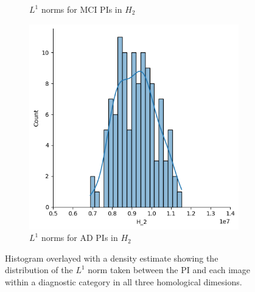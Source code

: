 \documentclass{article}
\begin{document}
\begin{figure}[htb]
\begin{subfigure}{0.32\textwidth}
    \caption{$L^1$ norms for MCI PIs in $H_2$}
  \end{subfigure}
  \begin{subfigure}{0.32\textwidth}
    \includegraphics[width=\textwidth]{figures/median_pis/median_pi_AD_H_2_displot.png}
    \caption{$L^1$ norms for AD PIs in $H_2$}
  \end{subfigure}
  \caption{Histogram overlayed with a density estimate showing the distribution of the $L^1$ norm
taken between the PI and each image within a diagnostic category in all three homological
dimesions.}
  \label{fig:displots_median_pi}
\end{figure}
\end{document}
